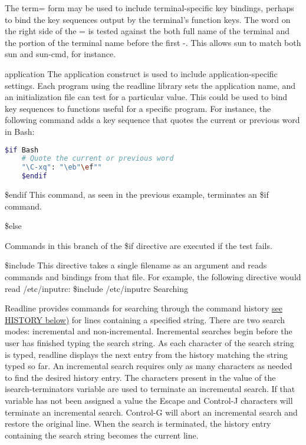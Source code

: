 The term= form may be used to include terminal-specific key bindings, perhaps to bind the key sequences output by the terminal's function keys. The word on the right side of the = is tested against the both full name of the terminal and the portion of the terminal name before the first -. This allows sun to match both sun and sun-cmd, for instance.

application
The application construct is used to include application-specific settings. Each program using the readline library sets the application name, and an initialization file can test for a particular value. This could be used to bind key sequences to functions useful for a specific program. For instance, the following command adds a key sequence that quotes the current or previous word in Bash:

\begin{lstlisting}[language=bash]
    $if Bash
    # Quote the current or previous word
    "\C-xq": "\eb"\ef""
    $endif
\end{lstlisting} %


\$endif
This command, as seen in the previous example, terminates an \$if command.

\$else

Commands in this branch of the \$if directive are executed if the test fails.

\$include
This directive takes a single filename as an argument and reads commands and bindings from that file. For example, the following directive would read /etc/inputrc:
\$include  /etc/inputrc
Searching

Readline provides commands for searching through the command history \hyperref[sec:history]{see HISTORY below)} for lines containing a specified string. There are two search modes: incremental and non-incremental.
Incremental searches begin before the user has finished typing the search string. As each character of the search string is typed, readline displays the next entry from the history matching the string typed so far. An incremental search requires only as many characters as needed to find the desired history entry. The characters present in the value of the isearch-terminators variable are used to terminate an incremental search. If that variable has not been assigned a value the Escape and Control-J characters will terminate an incremental search. Control-G will abort an incremental search and restore the original line. When the search is terminated, the history entry containing the search string becomes the current line.

